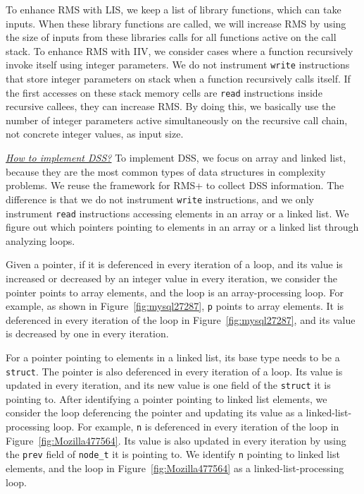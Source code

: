 To enhance RMS with LIS, we keep a list of library functions, which can take inputs.
When these library functions are called,
we will increase RMS by using the size of inputs from these libraries calls 
for all functions active on the call stack. 
To enhance RMS with IIV, 
we consider cases where a function recursively invoke itself using integer parameters. 
We do not instrument \texttt{write} instructions that store integer 
parameters on stack when a function recursively calls itself. 
If the first accesses on these stack memory cells are \texttt{read} 
instructions inside recursive callees, 
they can increase RMS. 
By doing this, we basically use the number of integer parameters 
active simultaneously on the recursive call chain, 
not concrete integer values, as input size.

{\textit{\underline{How to implement DSS?}}}
To implement DSS, we focus on array and linked list, 
because they are the most common types of data structures in complexity problems. 
We reuse the framework for RMS+ to collect DSS information.
The difference is that we do not instrument \texttt{write} instructions,
and we only instrument \texttt{read} instructions accessing elements 
in an array or a linked list.
We figure out which pointers pointing to elements in an array 
or a linked list through analyzing loops.

Given a pointer, 
if it is deferenced in every iteration of a loop, 
and its value is increased or decreased by an integer value in every iteration,
we consider the pointer points to array elements, 
and the loop is an array-processing loop. 
For example, as shown in Figure~\ref{fig:mysql27287}, 
\texttt{p} points to array elements. 
It is deferenced in every iteration of the loop in Figure~\ref{fig:mysql27287},
and its value is decreased by one in every iteration. 

For a pointer pointing to elements in a linked list,
its base type needs to be a \texttt{struct}. 
The pointer is also deferenced in every iteration of a loop.
Its value is updated in every iteration, 
and its new value is one field of the \texttt{struct} it is pointing to. 
After identifying a pointer pointing to linked list elements,
we consider the loop deferencing the pointer and updating its value as 
a linked-list-processing loop. 
For example, \texttt{n} is deferenced in every iteration of the loop
in Figure~\ref{fig:Mozilla477564}. 
Its value is also updated in every iteration by 
using the \texttt{prev} field of \texttt{node\_t} it is pointing to. 
We identify \texttt{n} pointing to linked list elements,
and the loop in Figure~\ref{fig:Mozilla477564} as a linked-list-processing loop.

